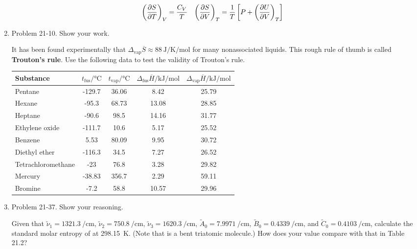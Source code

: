 \documentclass[../psets.tex]{subfiles}
\begin{document}
\begin{enumerate}
    \begin{align*}
        \left( \pdv{S}{T} \right)_V &= \frac{C_V}{T}&
        \left( \pdv{S}{V} \right)_T &= \frac{1}{T}\left[ P+\left( \pdv{U}{V} \right)_T \right]
    \end{align*}
    \item Problem 21-10. Show your work.\par
    It has been found experimentally that $\Delta_\text{vap}\overline{S}\approx\SI{88}{\joule\per\kelvin\per\mole}$ for many nonassociated liquids. This rough rule of thumb is called \textbf{Trouton's rule}. Use the following data to test the validity of Trouton's rule.
    \begin{center}
        \small
        \renewcommand{\arraystretch}{1.2}
        \begin{tabular}{
            l
            c
            S[table-format=3.2]
            S[table-format=2.2]
            S[table-format=2.2]
        }
            \toprule
            Substance & {$t_\text{fus}/\si{\celsius}$} & {$t_\text{vap}/\si{\celsius}$} & {$\Delta_\text{fus}\overline{H}/\si{\kilo\joule\per\mole}$} & {$\Delta_\text{vap}\overline{H}/\si{\kilo\joule\per\mole}$}\\
            \midrule
            Pentane            & -129.7 & 36.06 & 8.42  & 25.79\\
            Hexane             & -95.3  & 68.73 & 13.08 & 28.85\\
            Heptane            & -90.6  & 98.5  & 14.16 & 31.77\\
            Ethylene oxide     & -111.7 & 10.6  & 5.17  & 25.52\\
            Benzene            & 5.53   & 80.09 & 9.95  & 30.72\\
            Diethyl ether      & -116.3 & 34.5  & 7.27  & 26.52\\
            Tetrachloromethane & -23    & 76.8  & 3.28  & 29.82\\
            Mercury            & -38.83 & 356.7 & 2.29  & 59.11\\
            Bromine            & -7.2   & 58.8  & 10.57 & 29.96\\
            \bottomrule
        \end{tabular}
    \end{center}
    \item Problem 21-37. Show your reasoning.\par
    Given that $\tilde{\nu}_1=\SI{1321.3}{\per\centi\meter}$, $\tilde{\nu}_2=\SI{750.8}{\per\centi\meter}$, $\tilde{\nu}_3=\SI{1620.3}{\per\centi\meter}$, $\tilde{A}_0=\SI{7.9971}{\per\centi\meter}$, $\tilde{B}_0=\SI{0.4339}{\per\centi\meter}$, and $\tilde{C}_0=\SI{0.4103}{\per\centi\meter}$, calculate the standard molar entropy of  at \SI{298.15}{\kelvin}. (Note that  is a bent triatomic molecule.) How does your value compare with that in Table 21.2?
\end{enumerate}
\end{document}
